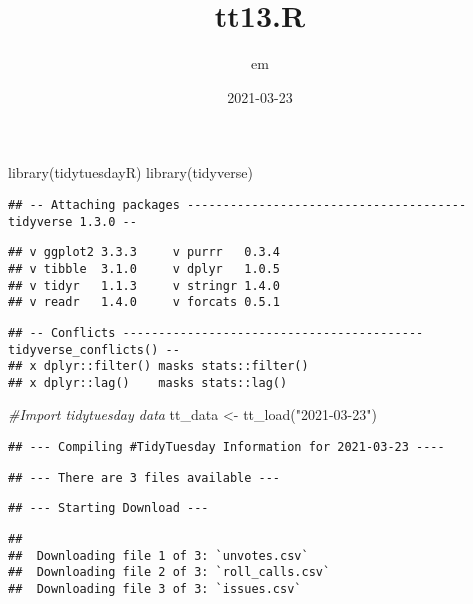 \documentclass[
]{article}
\title{tt13.R}
\author{em}
\date{2021-03-23}
\newenvironment{Shaded}{\begin{snugshade}}{\end{snugshade}}
\newcommand{\CommentTok}[1]{\textcolor[rgb]{0.56,0.35,0.01}{\textit{#1}}}
\newcommand{\FunctionTok}[1]{\textcolor[rgb]{0.00,0.00,0.00}{#1}}
\newcommand{\NormalTok}[1]{#1}
\newcommand{\OtherTok}[1]{\textcolor[rgb]{0.56,0.35,0.01}{#1}}
\newcommand{\StringTok}[1]{\textcolor[rgb]{0.31,0.60,0.02}{#1}}
\begin{document}
\maketitle

\begin{Shaded}
\begin{Highlighting}[]
\FunctionTok{library}\NormalTok{(tidytuesdayR)}
\FunctionTok{library}\NormalTok{(tidyverse)}
\end{Highlighting}
\end{Shaded}

\begin{verbatim}
## -- Attaching packages --------------------------------------- tidyverse 1.3.0 --
\end{verbatim}

\begin{verbatim}
## v ggplot2 3.3.3     v purrr   0.3.4
## v tibble  3.1.0     v dplyr   1.0.5
## v tidyr   1.1.3     v stringr 1.4.0
## v readr   1.4.0     v forcats 0.5.1
\end{verbatim}

\begin{verbatim}
## -- Conflicts ------------------------------------------ tidyverse_conflicts() --
## x dplyr::filter() masks stats::filter()
## x dplyr::lag()    masks stats::lag()
\end{verbatim}

\begin{Shaded}
\begin{Highlighting}[]
\CommentTok{\#Import tidytuesday data}
\NormalTok{tt\_data }\OtherTok{\textless{}{-}} \FunctionTok{tt\_load}\NormalTok{(}\StringTok{"2021{-}03{-}23"}\NormalTok{)}
\end{Highlighting}
\end{Shaded}

\begin{verbatim}
## --- Compiling #TidyTuesday Information for 2021-03-23 ----
\end{verbatim}

\begin{verbatim}
## --- There are 3 files available ---
\end{verbatim}

\begin{verbatim}
## --- Starting Download ---
\end{verbatim}

\begin{verbatim}
## 
##  Downloading file 1 of 3: `unvotes.csv`
##  Downloading file 2 of 3: `roll_calls.csv`
##  Downloading file 3 of 3: `issues.csv`
\end{verbatim}
\end{document}
